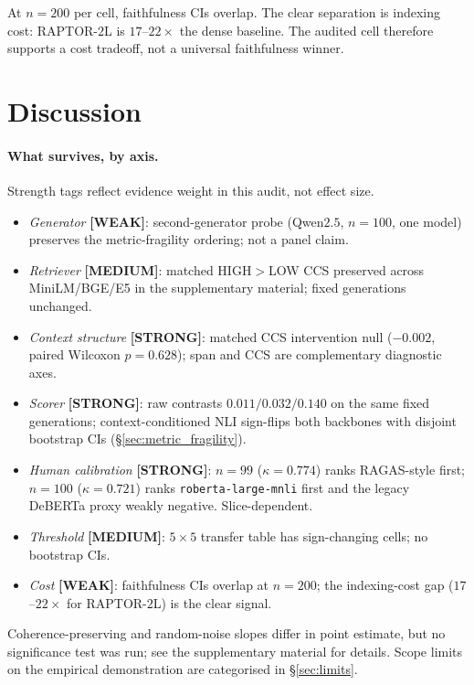 At $n=200$ per cell, faithfulness CIs overlap. The clear separation is
indexing cost: RAPTOR-$2$L is $17$--$22\times$ the dense baseline.
The audited cell therefore supports a cost tradeoff, not a universal
faithfulness winner.

\section{Discussion}
\label{sec:discussion}

\paragraph{What survives, by axis.} Strength tags reflect evidence
weight in this audit, not effect size.
\begin{itemize}\setlength{\itemsep}{0pt}\setlength{\parsep}{0pt}\setlength{\topsep}{2pt}
\item \emph{Generator} \textbf{[WEAK]}: second-generator probe
  (Qwen$2.5$, $n=100$, one model) preserves the metric-fragility
  ordering; not a panel claim.
\item \emph{Retriever} \textbf{[MEDIUM]}: matched HIGH$>$LOW CCS
  preserved across MiniLM/BGE/E5 in the supplementary material;
  fixed generations unchanged.
\item \emph{Context structure} \textbf{[STRONG]}: matched CCS
  intervention null ($-0.002$, paired Wilcoxon $p=0.628$); span and
  CCS are complementary diagnostic axes.
\item \emph{Scorer} \textbf{[STRONG]}: raw contrasts
  $0.011 / 0.032 / 0.140$ on the same fixed generations;
  context-conditioned NLI sign-flips both backbones with disjoint
  bootstrap CIs (\S\ref{sec:metric_fragility}).
\item \emph{Human calibration} \textbf{[STRONG]}:
  $n=99$ ($\kappa=0.774$) ranks RAGAS-style first;
  $n=100$ ($\kappa=0.721$) ranks \texttt{roberta-large-mnli} first
  and the legacy DeBERTa proxy weakly negative. Slice-dependent.
\item \emph{Threshold} \textbf{[MEDIUM]}: $5{\times}5$ transfer
  table has sign-changing cells; no bootstrap CIs.
\item \emph{Cost} \textbf{[WEAK]}: faithfulness CIs overlap at
  $n=200$; the indexing-cost gap ($17$--$22\times$ for RAPTOR-$2$L)
  is the clear signal.
\end{itemize}
Coherence-preserving and random-noise slopes differ in point
estimate, but no significance test was run; see the supplementary material
for details. Scope limits on the empirical demonstration are
categorised in \S\ref{sec:limits}.

